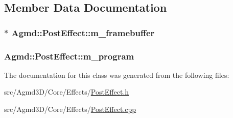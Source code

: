 \subsection{Member Data Documentation}
\hypertarget{class_agmd_1_1_post_effect_a13821c8d90685a9f75609d21953c3dab}{
\subsubsection[{m\+\_\+framebuffer}]{$\ast$ Agmd\+::\+Post\+Effect\+::m\+\_\+framebuffer\hspace{0.3cm}{\ttfamily [protected]}}}\label{class_agmd_1_1_post_effect_a13821c8d90685a9f75609d21953c3dab}
\hypertarget{class_agmd_1_1_post_effect_af0555b6dbaa69901d113e8b88353c160}{
\subsubsection[{m\+\_\+program}]{ Agmd\+::\+Post\+Effect\+::m\+\_\+program\hspace{0.3cm}{\ttfamily [protected]}}}\label{class_agmd_1_1_post_effect_af0555b6dbaa69901d113e8b88353c160}


The documentation for this class was generated from the following files\+:\begin{DoxyCompactItemize}
\item 
src/\+Agmd3\+D/\+Core/\+Effects/\hyperlink{_post_effect_8h}{Post\+Effect.\+h}\item 
src/\+Agmd3\+D/\+Core/\+Effects/\hyperlink{_post_effect_8cpp}{Post\+Effect.\+cpp}\end{DoxyCompactItemize}

